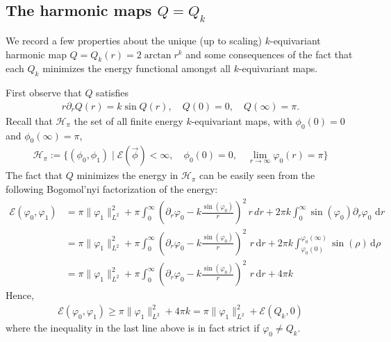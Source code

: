 \documentclass[10pt,reqno]{amsart}
\newcommand{\E}{\mathcal{E}}
\newcommand{\HH}{\mathcal{H}}
\newcommand{\fy}{\varphi}
\newcommand{\p}{\partial}
\newcommand{\I}{\infty}
\newcommand{\ant}[1]{\begin{align*}\begin{split} #1 \end{split}\end{align*}}
\newcommand{\EQ}[1]{\begin{equation}\begin{split} #1 \end{split}\end{equation}}
\numberwithin{equation}{section}
\theoremstyle{remark}
\newcommand{\rdr}{ \, r \, \mathrm{d}r}
\newcommand{\dr}{\, \mathrm{d}r}
\newcommand{\ud}{\mathrm{d}}
\newcommand{\0}{\emptyset}
\begin{document}
 \subsection{The harmonic maps $Q = Q_k$} \label{s:hm} 
 
 We record a few properties about the unique (up to scaling) $k$-equivariant harmonic map $Q = Q_k(r) = 2 \arctan r^k$ and some consequences of the fact that each $Q_k$ minimizes the energy functional amongst all  $k$-equivariant  maps. 
  
First observe  that $Q$ satisfies 
 \EQ{
 r \p_r Q(r) = k \sin Q(r), \quad Q(0) = 0, \quad Q(\infty) = \pi.
 }
Recall that  $\HH_\pi$ the set of all finite energy $k$-equivariant maps, with $\phi_0(0) = 0$ and  $\phi_0(\infty) = \pi$, 
  \EQ{
 \HH_\pi:= \{ (\phi_0, \phi_1) \mid \E(\vec \phi)< \infty, \quad \phi_0(0) = 0, \quad \lim_{r \to \infty} \fy_0(r) = \pi\}
 }
 The fact that $Q$ minimizes the energy in $\HH_\pi$ can be easily seen from the following Bogomol'nyi factorization of the energy:
\EQ{ \label{eq:bog}
  \E( \fy_0, \fy_1)  &=   \pi \| \fy_1 \|_{L^2}^2 +  \pi \int_0^{\infty} \left(\p_r \fy_0  - k\frac{\sin(\fy_0)}{r}\right)^2 \, r\, dr +  2\pi k \int_0^{\infty} \sin(\fy_0) \p_r\fy_0 \, \dr\\
&= \pi \| \fy_1 \|_{L^2}^2  + \pi \int_0^{\infty} \left(\p_r \fy_0  - k\frac{\sin(\fy_0)}{r}\right)^2 \, \rdr + 2 \pi k \int_{\fy_0(0)}^{\fy_0(\infty)} \sin(\rho)  \, \ud\rho \\
&  =  \pi \| \fy_1 \|_{L^2}^2  +  \pi \int_0^{\infty} \left(\p_r \fy_0  - k\frac{\sin(\fy_0)}{r}\right)^2 \, \rdr  + 4\pi k
}
Hence, 
\begin{align} \label{var char}
\E(\fy_0, \fy_1) \ge\pi  \| \fy_1 \|_{L^2}^2 + 4 \pi k =  \pi \| \fy_1 \|_{L^2}^2 + \E(Q_k, 0)
\end{align}
where the inequality in the last line above is in fact strict if $\fy_0 \neq Q_k$. 
\end{document}

